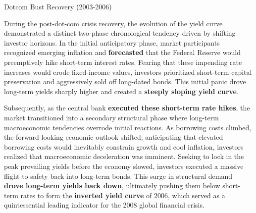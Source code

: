 \documentclass[10pt]{article}
\begin{document}
    \begin{core}{Dotcom Bust Recovery (2003-2006)}

      During the post-dot-com crisis recovery, the evolution of the yield curve demonstrated a distinct two-phase chronological tendency driven by shifting investor horizons. In the initial anticipatory phase, market participants recognized emerging inflation and \textbf{forecasted} that the Federal Reserve would preemptively hike short-term interest rates. Fearing that these impending rate increases would erode fixed-income values, investors prioritized short-term capital preservation and aggressively sold off long-dated bonds. This initial panic drove long-term yields sharply higher and created a \textbf{steeply sloping yield curve}.

      Subsequently, as the central bank \textbf{executed these short-term rate hikes}, the market transitioned into a secondary structural phase where long-term macroeconomic tendencies overrode initial reactions. As borrowing costs climbed, the forward-looking economic outlook shifted; anticipating that elevated borrowing costs would inevitably constrain growth and cool inflation, investors realized that macroeconomic deceleration was imminent. Seeking to lock in the peak prevailing yields before the economy slowed, investors executed a massive flight to safety back into long-term bonds. This surge in structural demand \textbf{drove long-term yields back down}, ultimately pushing them below short-term rates to form the \textbf{inverted yield curve} of 2006, which served as a quintessential leading indicator for the 2008 global financial crisis.


    \end{core}
\end{document}
